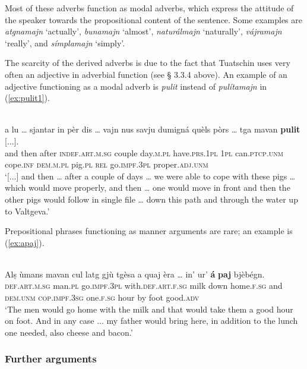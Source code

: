 Most of these adverbs function as modal adverbs, which express the attitude of the speaker towards the propositional content of the sentence. Some examples are \textit{atgnamajn} `actually', \textit{bunamajn} `almost', \textit{naturálmajn} `naturally', \textit{vájramajn} `really', and \textit{símplamajn} `simply'.

The scarcity of the derived adverbs is due to the fact that Tuatschin uses very often an adjective in adverbial function (see § 3.3.4 above). An example of an adjective functioning as a modal adverb is \textit{pulit} instead of \textit{pulítamajn} in (\ref{ex:pulit1}).

\ea
\label{ex:pulit1}
\\
\gll [...] a lu … sjantar in pèr dis … vajn nus savju dumigná quèls pòrs … tga mavan \textbf{pulit} [...].\\
{} and then {} after \textsc{indef.art.m.sg} couple day.\textsc{m.pl} {} have.\textsc{prs.1pl} \textsc{1pl} can.\textsc{ptcp.unm} cope.\textsc{inf} \textsc{dem.m.pl} pig.\textsc{pl} {} \textsc{rel}  go.\textsc{impf.3pl} proper.\textsc{adj.unm} \\
\glt `[...] and then … after a couple of days … we were able to cope with these pigs … which would move properly, and then … one would move in front and then the other pigs would follow in single file … down this path and through the water up to Valtgeva.'
\z



Prepositional phrases functioning as manner arguments are rare; an example is (\ref{ex:apaj}).

\ea
\label{ex:apaj}
\\
\gll Alṣ ùmans mavan cul latg gjù tgèsa a quaj èra … in' ur’ \textbf{á} \textbf{paj} bjèbégn.\\
\textsc{def.art.m.sg} man.\textsc{pl} go.\textsc{impf.3pl} with.\textsc{def.art.f.sg} milk down home.\textsc{f.sg} and \textsc{dem.unm} \textsc{cop.impf.3sg} {} one.\textsc{f.sg} hour by foot good.\textsc{adv}\\
\glt `The men would go home with the milk and that would take them a good hour on foot. And in any case ... my father would bring here, in addition to the lunch one needed, also cheese and bacon.'
\z

\subsubsection{Further arguments}

